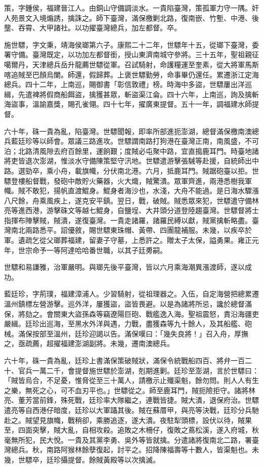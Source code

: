 \begin{pinyinscope}
策，字鍾侯，福建晉江人。由銅山守備調淡水。一貴陷臺灣，策孤軍力守一隅。奸人苑景文入境煽誘，擒誅之。師下臺灣，滿保檄剿北路，復南嵌、竹塹、中港、後壟、吞霄、大甲諸社。以功擢臺灣總兵，加左都督。卒。

施世驃，字文秉，靖海侯瑯第六子。康熙二十二年，世驃年十五，從瑯下臺灣，委署守備。臺灣既定，以功加左都督銜，授山東濟南城守參將。三十五年，聖祖親征噶爾丹，天津總兵岳升龍薦世驃從軍。召試騎射，命護糧運至奎素，從大將軍馬斯喀追賊至巴顏烏闌。師還，假歸葬。上褒世驃勤勞，命事畢仍還任。累遷浙江定海總兵。四十二年，上南巡，賜御書「彰信敦禮」榜。時海中多盜，世驃屢出洋巡緝，先遣裨將假商船餌盜，擒獲甚眾，斬盜渠江侖。四十六年，上南巡，詢及擒斬海盜事，溫諭嘉獎，賜孔雀翎。四十七年，擢廣東提督。五十一年，調福建水師提督。

六十年，硃一貴為亂，陷臺灣。世驃聞報，即率所部進扼澎湖，總督滿保檄南澳總兵藍廷珍等以師會。眾議三路進攻。世驃謂南路打狗港在臺灣正南，南風盛，不可泊；北路清風隙去府百餘里，運餉艱；度賊必屯聚中路，宜直搗鹿耳門。時臺地諸將吏皆退次澎湖，惟淡水守備陳策堅守汛地。世驃遣游擊張駴等赴援，自統師出中路。選勁卒，乘小舟，載旗幟，分伏南北港。六月，抵鹿耳門。賊踞砲臺以拒。世驃登樓船督戰，發砲中敵貯火藥器，火大熾，賊驚潰。眾軍齊進，兩港悉樹我軍幟。賊不敢犯，揚帆直渡鯤身。鯤身者海沙也，水淺，大舟不能過。是日海水驟漲八尺餘，舟乘風疾上，遂克安平鎮。翌日，戰，破賊。賊悉眾來犯，世驃遣守備林亮等進西港，游擊硃文等越七鯤身，自鹽埕、大井頭分道登陸趨臺灣。世驃督將士指揮布陣擊賊，賊潰，遂復臺灣。一貴走諸羅，諸羅民縛以獻，賊黨擒斬略盡。臺灣南北兩路悉平。詔優敘，賜世驃東珠帽、黃帶、四團龍補服。未幾，以疾卒於軍。遺疏乞從父瑯葬福建，留妻子守墓，上悉許之。贈太子太保，謚勇果。雍正元年，世宗命予一等阿達哈哈番世職，以其子廷旉嗣。

世驃和易謙雅，治軍嚴明。與瑯先後平臺灣，皆以六月乘海潮異漲渡師，遂以成功。

藍廷珍，字荊璞，福建漳浦人。少習騎射，從祖理器之。入伍，自定海營把總累遷溫州鎮標左營游擊。巡外洋，屢獲盜，盜皆畏避。以是為諸將所忌，讒於總督滿保，將劾之。會關東大盜孫森等竊遼陽巨砲、戰艦逸入海。聖祖震怒，責沿海疆吏嚴緝。廷珍出巡海，至黑水外洋與遇，力戰，盡獲森等九十餘人，及其船艦、砲械。滿保按部至溫州，廷珍迎謁以告。滿保嘆曰：「幾失良將！」召入舟，厚撫之，亟疏薦，超擢福建澎湖副將。未幾，遷南澳總兵。

六十年，硃一貴為亂，廷珍上書滿保策破賊狀，滿保令統戰船四百、將弁一百二十、官兵一萬二千，會提督施世驃於澎湖，剋期進剿。廷珍至澎湖，言於世驃曰：「賊皆烏合，不足憂，惟脅從至三十萬人，請檄示止殲渠魁，餘勿問。則人人有生之樂，無死之心，可不血刃平也。」世驃從之。師至鹿耳門，賊扼險拒守。諸將林亮、董芳當前鋒，殊死戰，廷珍率大隊繼之，連戰皆捷。賊大潰，退保府治。世驃遣亮等自西港仔暗度，廷珍以大軍躡其後。賊在蘇厝甲，與亮等決戰，廷珍分兵馳赴之。賊望見旗幟，戰稍卻，乘勝追逐，遂大潰。夜駐犁頭標，設伏以待，賊果至，四面突擊，賊大亂，自相攻殺。追敗之木柵仔，復敗之蔦松溪，遂入府城，秋毫無所犯，民大悅。一貴及其黨李勇、吳外等皆就擒。分遣諸將復南北二路，署臺灣總兵。秋，南路阿猴林餘孽復起，討平之。招降陳福壽等十數人，皆渠魁也。未幾，世驃卒，廷珍攝提督。餘賊黃殿等以次擒滅。


\end{pinyinscope}
